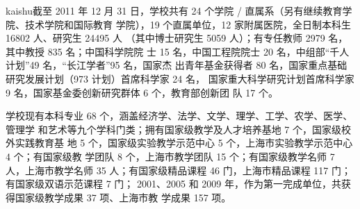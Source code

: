 {\ifcsname kaishu\endcsname\kaishu\else[无 \cs{kaishu} 字体。]\fi 截至 2011 年
  12 月 31 日，学校共有 24 个学院 / 直属系（另有继续教育学院、技术学院和国际教育
  学院），19 个直属单位，12 家附属医院，全日制本科生 16802 人、研究生 24495 人
  （其中博士研究生 5059 人）；有专任教师 2979 名，其中教授 835 名；中国科学院院
  士 15 名，中国工程院院士 20 名，中组部“千人计划”49 名，“长江学者”95 名，国家杰
  出青年基金获得者 80 名，国家重点基础研究发展计划（973 计划）首席科学家 24 名，
  国家重大科学研究计划首席科学家 9 名，国家基金委创新研究群体 6 个，教育部创新团
  队 17 个。
  
  学校现有本科专业 68 个，涵盖经济学、法学、文学、理学、工学、农学、医学、管理学
  和艺术等九个学科门类；拥有国家级教学及人才培养基地 7 个，国家级校外实践教育基
  地 5 个，国家级实验教学示范中心 5 个，上海市实验教学示范中心 4 个；有国家级教
  学团队 8 个，上海市教学团队 15 个；有国家级教学名师 7 人，上海市教学名师 35
  人；有国家级精品课程 46 门，上海市精品课程 117 门；有国家级双语示范课程 7 门；
  2001、2005 和 2009 年，作为第一完成单位，共获得国家级教学成果 37 项、上海市教
  学成果 157 项。}
